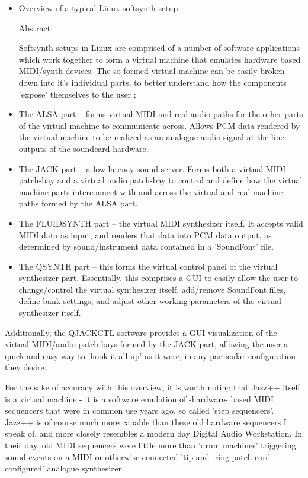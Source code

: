 \documentclass[letterpaper]{report}
\begin{document}
\begin{itemize}

\item  Overview of a typical Linux softsynth setup

Abstract:

Softsynth setups in Linux are comprised of a number of
software applications which work together to form a virtual
machine that emulates hardware based MIDI/synth devices. The
so formed virtual machine can be easily broken down into it's
individual parts, to better understand how the components
'expose' themselves to the user ;

\item The ALSA part -- forms virtual MIDI and real audio paths for the
other parts of the virtual machine to communicate across. Allows
PCM data rendered by the virtual machine to be realized as an
analogue audio signal at the line outputs of the soundcard hardware.

\item The JACK part -- a low-latency sound server. Forms both a virtual
MIDI patch-bay and a virtual audio patch-bay to control and
define how the virtual machine parts interconnect with and across
the virtual and real machine paths formed by the ALSA part.

\item The FLUIDSYNTH part -- the virtual MIDI synthesizer itself. It
accepts valid MIDI data as input, and renders that data into
PCM data output, as determined by sound/instrument data contained
in a 'SoundFont' file.

\item The QSYNTH part -- this forms the virtual control panel of the
virtual synthesizer part. Essentially, this comprises a GUI to
easily allow the user to change/control the virtual synthesizer
itself, add/remove SoundFont files, define bank settings, and
adjust other working parameters of the virtual synthesizer itself.

\end{itemize}

Additionally, the QJACKCTL software provides a GUI visualization
of the virtual MIDI/audio patch-bays formed by the JACK part,
allowing the user a quick and easy way to 'hook it all up' as it
were, in any particular configuration they desire.

For the sake of accuracy with this overview, it is worth noting
that Jazz++ itself is a virtual machine - it is a software emulation
of -hardware- based MIDI sequencers that were in common use years
ago, so called 'step sequencers'. Jazz++ is of course much more
capable than these old hardware sequencers I speak of, and more
closely resembles a modern day Digital Audio Workstation. In their
day, old MIDI sequencers were little more than 'drum machines'
triggering sound events on a MIDI or otherwise connected 'tip-and
-ring patch cord configured' analogue synthesizer.
\end{document}
